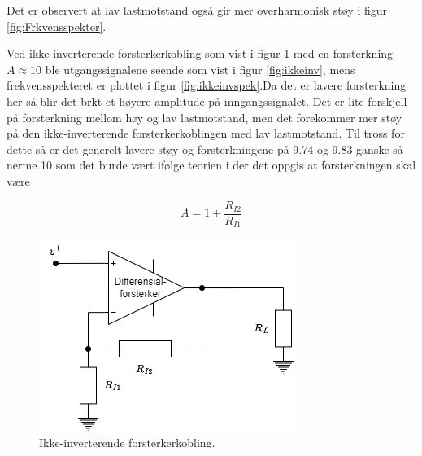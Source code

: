 Det er observert at lav lastmotstand også gir mer overharmonisk støy i figur \ref{fig:Frkvensspekter}.

Ved ikke-inverterende forsterkerkobling som vist i figur \ref{fig:Ikke-inverterende} med en forsterkning $A \approx 10$ ble utgangssignalene seende som vist i figur \ref{fig:ikkeinv}, mens frekvensspekteret er plottet i figur \ref{fig:ikkeinvspek}.Da det er lavere forsterkning her så blir det brkt et høyere amplitude på inngangssignalet. Det er lite forskjell på forsterkning mellom høy og lav lastmotstand, men det forekommer mer støy på den ikke-inverterende forsterkerkoblingen med lav lastmotstand. Til tross for dette så er det generelt lavere støy og forsterkningene på 9.74 og 9.83 ganske så nerme 10 som det burde vært ifølge teorien i \cite{a2020_glossary} der det oppgis at forsterkningen skal være

\begin{equation}
    A=1+\frac{R_{I2}}{R_{I1}}
\end{equation}


\begin{figure}[!hbt]
	\centering
	\includegraphics[scale=0.4]{./Images/03Research/ikkeinverterende.png}
	\caption{Ikke-inverterende forsterkerkobling.}
	\label{fig:Ikke-inverterende}
\end{figure}


